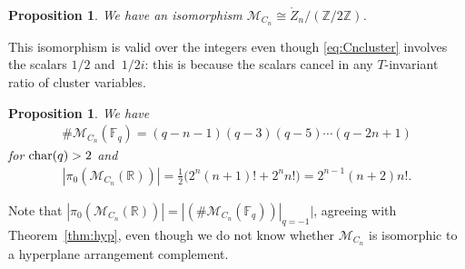 \documentclass[pdftex]{sigma}%
\def\R{{\mathbb R}}
\def\Z{{\mathbb Z}}
\def\F{{\mathbb F}}
\def\Zo{{\mathring{Z}}}
\def\M{{\mathcal{M}}}
\numberwithin{equation}{section}
\newtheorem{Proposition}[Theorem]{Proposition}
\begin{document}
\begin{Proposition}\label{prop:Cnconfig}
We have an isomorphism $\M_{C_n} \cong \Zo_n/(\Z/2\Z)$.
\end{Proposition}

This isomorphism is valid over the integers even though \eqref{eq:Cncluster} involves the scalars $1/2$ and~$1/2i$: this is because the scalars cancel in any $T$-invariant ratio of cluster variables.

\begin{Proposition}
We have
\begin{gather*}
\# \M_{C_n}(\F_q) = (q-n-1)(q-3)(q-5) \cdots (q-2n+1)
\end{gather*}
for ${\rm char}(q) > 2$ and
\begin{gather*}
|\pi_0( \M_{C_n}(\R))| = \frac{1}{2}\big( 2^n (n+1)! + 2^n n!\big) = 2^{n-1}(n+2) n!.
\end{gather*}
\end{Proposition}
Note that $|\pi_0( \M_{C_n}(\R))| = |(\# \M_{C_n}(\F_q))|_{q=-1}|$, agreeing with Theorem~\ref{thm:hyp}, even though we do not know whether $\M_{C_n}$ is isomorphic to a hyperplane arrangement complement.
\end{document}
